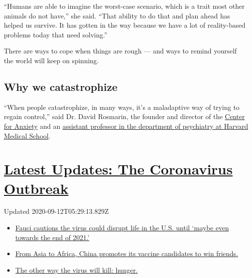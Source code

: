 ``Humans are able to imagine the worst-case scenario, which is a trait
most other animals do not have,'' she said. ``That ability to do that
and plan ahead has helped us survive. It has gotten in the way because
we have a lot of reality-based problems today that need solving.''

There are ways to cope when things are rough --- and ways to remind
yourself the world will keep on spinning.

\hypertarget{why-we-catastrophize}{%
\subsection{Why we catastrophize}\label{why-we-catastrophize}}

``When people catastrophize, in many ways, it's a maladaptive way of
trying to regain control,'' said Dr. David Rosmarin, the founder and
director of the \href{http://www.centerforanxiety.org/}{Center for
Anxiety} and an
\href{http://www.mcleanhospital.org/biography/david-h-rosmarin}{assistant
professor in the department of psychiatry at Harvard Medical School}.

\hypertarget{latest-updates-the-coronavirus-outbreak}{%
\section{\texorpdfstring{\href{https://www.nytimes3xbfgragh.onion/2020/09/11/world/covid-19-coronavirus.html?action=click\&pgtype=Article\&state=default\&region=MAIN_CONTENT_1\&context=storylines_live_updates}{Latest
Updates: The Coronavirus
Outbreak}}{Latest Updates: The Coronavirus Outbreak}}\label{latest-updates-the-coronavirus-outbreak}}

Updated 2020-09-12T05:29:13.829Z

\begin{itemize}
\tightlist
\item
  \href{https://www.nytimes3xbfgragh.onion/2020/09/11/world/covid-19-coronavirus.html?action=click\&pgtype=Article\&state=default\&region=MAIN_CONTENT_1\&context=storylines_live_updates\#link-dfb8a16}{Fauci
  cautions the virus could disrupt life in the U.S. until `maybe even
  towards the end of 2021.'}
\item
  \href{https://www.nytimes3xbfgragh.onion/2020/09/11/world/covid-19-coronavirus.html?action=click\&pgtype=Article\&state=default\&region=MAIN_CONTENT_1\&context=storylines_live_updates\#link-7104d154}{From
  Asia to Africa, China promotes its vaccine candidates to win friends.}
\item
  \href{https://www.nytimes3xbfgragh.onion/2020/09/11/world/covid-19-coronavirus.html?action=click\&pgtype=Article\&state=default\&region=MAIN_CONTENT_1\&context=storylines_live_updates\#link-393ad215}{The
  other way the virus will kill: hunger.}
\end{itemize}

